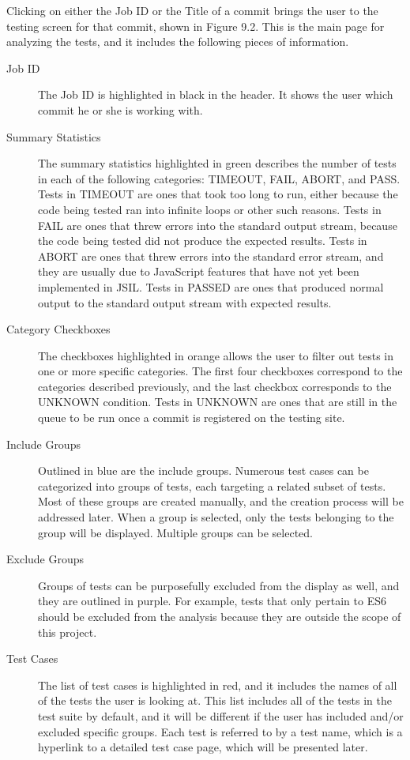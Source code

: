 \documentclass[a4paper,11pt,twoside]{report}
\begin{document}
Clicking on either the Job ID or the Title of a commit brings the user to the testing screen for that commit, shown in Figure 9.2. This is the main page for analyzing the tests, and it includes the following pieces of information.

\begin{description}
\item[Job ID] The Job ID is highlighted in black in the header. It shows the user which commit he or she is working with.

\item[Summary Statistics] The summary statistics highlighted in green describes the number of tests in each of the following categories: TIMEOUT, FAIL, ABORT, and PASS. Tests in TIMEOUT are ones that took too long to run, either because the code being tested ran into infinite loops or other such reasons. Tests in FAIL are ones that threw errors into the standard output stream, because the code being tested did not produce the expected results. Tests in ABORT are ones that threw errors into the standard error stream, and they are usually due to JavaScript features that have not yet been implemented in JSIL. Tests in PASSED are ones that produced normal output to the standard output stream with expected results.

\item[Category Checkboxes] The checkboxes highlighted in orange allows the user to filter out tests in one or more specific categories. The first four checkboxes correspond to the categories described previously, and the last checkbox corresponds to the UNKNOWN condition. Tests in UNKNOWN are ones that are still in the queue to be run once a commit is registered on the testing site.

\item[Include Groups] Outlined in blue are the include groups. Numerous test cases can be categorized into groups of tests, each targeting a related subset of tests. Most of these groups are created manually, and the creation process will be addressed later. When a group is selected, only the tests belonging to the group will be displayed. Multiple groups can be selected.

\item[Exclude Groups] Groups of tests can be purposefully excluded from the display as well, and they are outlined in purple. For example, tests that only pertain to ES6 should be excluded from the analysis because they are outside the scope of this project.

\item[Test Cases] The list of test cases is highlighted in red, and it includes the names of all of the tests the user is looking at. This list includes all of the tests in the test suite by default, and it will be different if the user has included and/or excluded specific groups. Each test is referred to by a test name, which is a hyperlink to a detailed test case page, which will be presented later.


\end{description}
\end{document}
